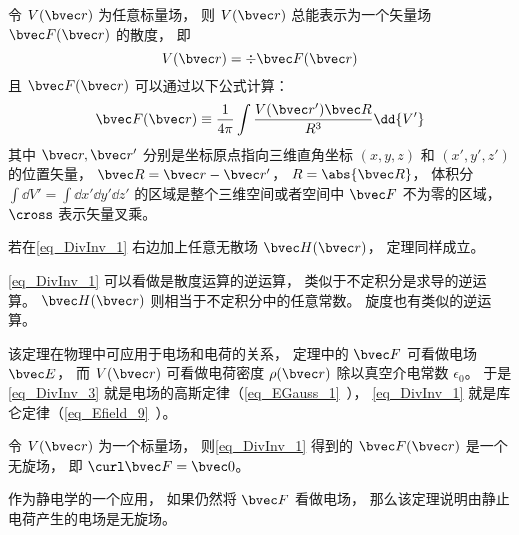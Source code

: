 

\begin{theorem}{}
令 $V(\bvec r)$ 为任意标量场， 则 $V(\bvec r)$ 总能表示为一个矢量场 $\bvec F(\bvec r)$ 的散度， 即
\begin{equation}\label{eq_DivInv_3}
V(\bvec r) = \div \bvec F(\bvec r)
\end{equation}
且 $\bvec F(\bvec r)$ 可以通过以下公式计算：
\begin{equation}\label{eq_DivInv_1}
\bvec F(\bvec r) \equiv \frac{1}{4\pi}\int \frac{V(\bvec r') \bvec R}{R^3} \dd{V'}
\end{equation}
其中 $\bvec r, \bvec r'$ 分别是坐标原点指向三维直角坐标 $(x, y, z)$ 和 $(x', y', z')$ 的位置矢量， $\bvec R = \bvec r - \bvec r'$， $R = \abs{\bvec R}$， 体积分 $\int\dd{V'} = \int\dd{x'}\dd{y'}\dd{z'}$ 的区域是整个三维空间或者空间中 $\bvec F$ 不为零的区域， $\cross$ 表示矢量叉乘。

若在\autoref{eq_DivInv_1} 右边加上任意无散场 $\bvec H(\bvec r)$， 定理同样成立。
\end{theorem}

\autoref{eq_DivInv_1} 可以看做是散度运算的逆运算， 类似于不定积分是求导的逆运算。 $\bvec H(\bvec r)$ 则相当于不定积分中的任意常数。 旋度也有类似的逆运算。

该定理在物理中可应用于电场和电荷的关系， 定理中的 $\bvec F$ 可看做电场 $\bvec E$， 而 $V(\bvec r)$ 可看做电荷密度 $\rho(\bvec r)$ 除以真空介电常数 $\epsilon_0$。 于是\autoref{eq_DivInv_3} 就是电场的高斯定律（\autoref{eq_EGauss_1}~）， \autoref{eq_DivInv_1} 就是库仑定律（\autoref{eq_Efield_9}~）。

\begin{theorem}{}\label{the_DivInv_1}
令 $V(\bvec r)$ 为一个标量场， 则\autoref{eq_DivInv_1} 得到的 $\bvec F(\bvec r)$ 是一个无旋场， 即 $\curl \bvec F = \bvec 0$。
\end{theorem}

作为静电学的一个应用， 如果仍然将 $\bvec F$ 看做电场， 那么该定理说明由静止电荷产生的电场是无旋场。

